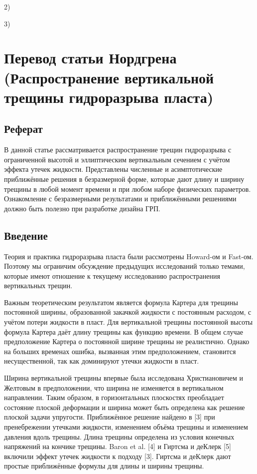 \documentclass[a4paper, 12pt]{article}
\begin{document}
2) 

3)

\newpage
\section{Перевод статьи Нордгрена (Распространение вертикальной трещины гидроразрыва пласта)}

\subsection{Реферат}
В данной статье рассматривается распространение трещин гидроразрыва с ограниченной высотой и эллиптическим вертикальным сечением с учётом эффекта утечек жидкости.
Представлены численные и асимптотические приближённые решения в безразмерной форме, которые дают длину и ширину трещины в любой момент времени и при любом наборе физических параметров.
Ознакомление с безразмерными результатами и приближёнными решениями должно быть полезно при разработке дизайна ГРП.

\subsection{Введение}
Теория и практика гидроразрыва пласта были рассмотрены Howard-ом и Fast-ом.
Поэтому мы ограничим обсуждение предыдущих исследований только темами, которые имеют отношение к текущему исследованию распространения вертикальных трещин.

Важным теоретическим результатом является формула Картера для трещины постоянной ширины, образованной закачкой жидкости с постоянным расходом, с учётом потери жидкости в пласт.
Для вертикальной трещины постоянной высоты формула Картера даёт длину трещины как функцию времени.
В общем случае предположение Картера о постоянной ширине трещины не реалистично.
Однако на больших временах ошибка, вызванная этим предположением, становится несущественной, так как доминируют утечки жидкости в пласт.

Ширина вертикальной трещины впервые была исследована Христиановичем и Желтовым в предположении, что ширина не изменяется в вертикальном направлении.
Таким образом, в горизонтальных плоскостях преобладает состояние плоской деформации и ширина может быть определена как решение плоской задачи упругости.
Приближённое решение найдено в [3] при пренебрежении утечками жидкости, изменением объёма трещины и изменением давления вдоль трещины.
Длина трещины определена из условия конечных напряжений на кончике трещины.
Baron et al. [4] и Гиртсма и деКлерк [5] включили эффект утечек жидкости к подходу [3].
Гиртсма и деКлерк дают простые приближённые формулы для длины и ширины трещины.
\end{document}
